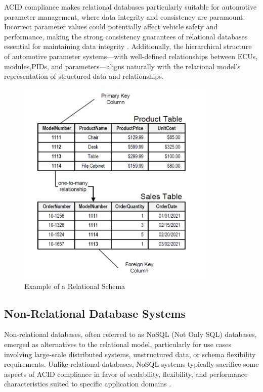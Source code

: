 ACID compliance makes relational databases particularly suitable for automotive parameter management, where data integrity and consistency are paramount. Incorrect parameter values could potentially affect vehicle safety and performance, making the strong consistency guarantees of relational databases essential for maintaining data integrity \cite{staron2021automotive}. Additionally, the hierarchical structure of automotive parameter systems—with well-defined relationships between \acp{ECU}, modules,\acp{PID}, and parameters—aligns naturally with the relational model's representation of structured data and relationships.

\begin{figure}[ht]
    \centering
    \includegraphics[width=0.85\textwidth]{figures/relational_schema.png}
    \caption{Example of a Relational Schema \cite{noah2024relational}}
    \label{fig:relational-schema}
\end{figure}

\subsection{Non-Relational Database Systems}
\label{subsec:non-relational-database-systems}

Non-relational databases, often referred to as NoSQL (Not Only SQL) databases, emerged as alternatives to the relational model, particularly for use cases involving large-scale distributed systems, unstructured data, or schema flexibility requirements. Unlike relational databases, NoSQL systems typically sacrifice some aspects of ACID compliance in favor of scalability, flexibility, and performance characteristics suited to specific application domains \cite{bhattacherjee2015principles}.

